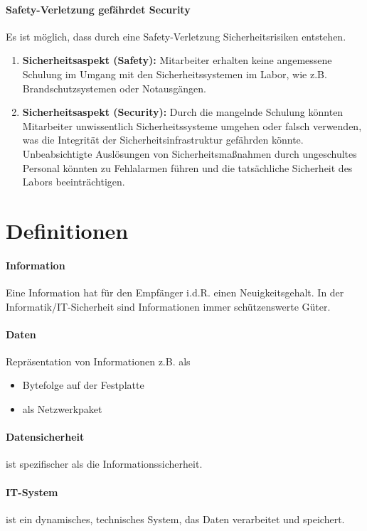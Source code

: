\documentclass{report}
\begin{document}
\paragraph{Safety-Verletzung gefährdet Security} Es ist möglich, dass durch eine Safety-Verletzung Sicherheitsrisiken entstehen.
\begin{enumerate}[label=\arabic*.]
    \item \textbf{Sicherheitsaspekt (Safety):} Mitarbeiter erhalten keine angemessene Schulung im Umgang mit den Sicherheitssystemen im Labor, wie z.B. Brandschutzsystemen oder Notausgängen.

    \item \textbf{Sicherheitsaspekt (Security):} Durch die mangelnde Schulung könnten Mitarbeiter unwissentlich Sicherheitssysteme umgehen oder falsch verwenden, was die Integrität der Sicherheitsinfrastruktur gefährden könnte. Unbeabsichtigte Auslösungen von Sicherheitsmaßnahmen durch ungeschultes Personal könnten zu Fehlalarmen führen und die tatsächliche Sicherheit des Labors beeinträchtigen.

\end{enumerate}
\section{Definitionen}
\paragraph{Information}
Eine Information hat für den Empfänger i.d.R. einen Neuigkeitsgehalt. 
In der Informatik/IT-Sicherheit sind Informationen immer schützenswerte Güter. 
\paragraph{Daten} Repräsentation von Informationen z.B. als 
\begin{itemize}
    \item Bytefolge auf der Festplatte
    \item als Netzwerkpaket
\end{itemize}
\paragraph{Datensicherheit} ist spezifischer als die Informationssicherheit.
\paragraph{IT-System} ist ein dynamisches, technisches System, das Daten verarbeitet und speichert.
\end{document}
